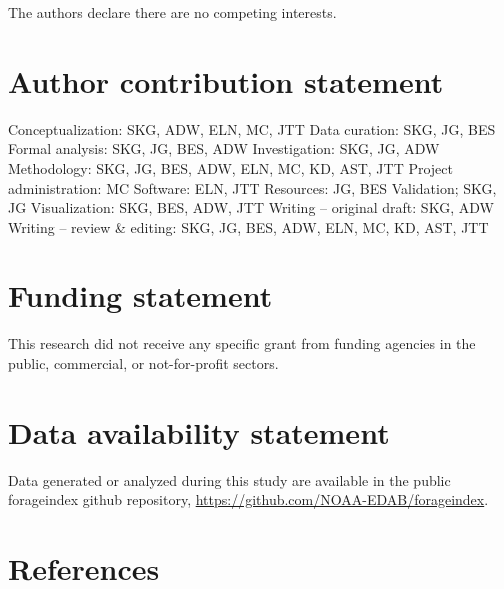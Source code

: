 \documentclass[
]{article}
\begin{document}
The authors declare there are no competing interests.

\hypertarget{author-contribution-statement}{%
\section{Author contribution statement}\label{author-contribution-statement}}

Conceptualization: SKG, ADW, ELN, MC, JTT
Data curation: SKG, JG, BES
Formal analysis: SKG, JG, BES, ADW
Investigation: SKG, JG, ADW
Methodology: SKG, JG, BES, ADW, ELN, MC, KD, AST, JTT
Project administration: MC
Software: ELN, JTT
Resources: JG, BES
Validation; SKG, JG
Visualization: SKG, BES, ADW, JTT
Writing -- original draft: SKG, ADW
Writing -- review \& editing: SKG, JG, BES, ADW, ELN, MC, KD, AST, JTT

\hypertarget{funding-statement}{%
\section{Funding statement}\label{funding-statement}}

This research did not receive any specific grant from funding agencies in the public, commercial, or not-for-profit sectors.

\hypertarget{data-availability-statement}{%
\section{Data availability statement}\label{data-availability-statement}}

Data generated or analyzed during this study are available in the public forageindex github repository, \url{https://github.com/NOAA-EDAB/forageindex}.

\hypertarget{references}{%
\section{References}\label{references}}
\end{document}
